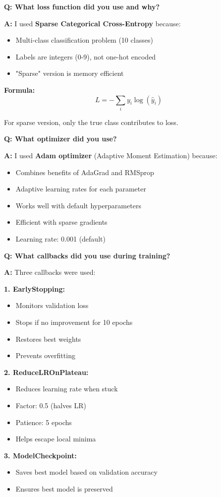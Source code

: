 \documentclass[a4paper,12pt]{article}
\newcommand{\vivaQ}[1]{\textcolor{questioncolor}{\textbf{Q: #1}}}
\newcommand{\vivaA}[1]{\textcolor{answercolor}{\textbf{A:}} #1}
\begin{document}
\vspace{0.5cm}

\vivaQ{What loss function did you use and why?}

\vivaA{I used \textbf{Sparse Categorical Cross-Entropy} because:
\begin{itemize}
    \item Multi-class classification problem (10 classes)
    \item Labels are integers (0-9), not one-hot encoded
    \item "Sparse" version is memory efficient
\end{itemize}

\textbf{Formula:}
\[L = -\sum_{i} y_i \log(\hat{y}_i)\]

For sparse version, only the true class contributes to loss.}

\vspace{0.5cm}

\vivaQ{What optimizer did you use?}

\vivaA{I used \textbf{Adam optimizer} (Adaptive Moment Estimation) because:
\begin{itemize}
    \item Combines benefits of AdaGrad and RMSprop
    \item Adaptive learning rates for each parameter
    \item Works well with default hyperparameters
    \item Efficient with sparse gradients
    \item Learning rate: 0.001 (default)
\end{itemize}}

\vspace{0.5cm}

\vivaQ{What callbacks did you use during training?}

\vivaA{Three callbacks were used:

\textbf{1. EarlyStopping:}
\begin{itemize}
    \item Monitors validation loss
    \item Stops if no improvement for 10 epochs
    \item Restores best weights
    \item Prevents overfitting
\end{itemize}

\textbf{2. ReduceLROnPlateau:}
\begin{itemize}
    \item Reduces learning rate when stuck
    \item Factor: 0.5 (halves LR)
    \item Patience: 5 epochs
    \item Helps escape local minima
\end{itemize}

\textbf{3. ModelCheckpoint:}
\begin{itemize}
    \item Saves best model based on validation accuracy
    \item Ensures best model is preserved
\end{itemize}}
\end{document}
